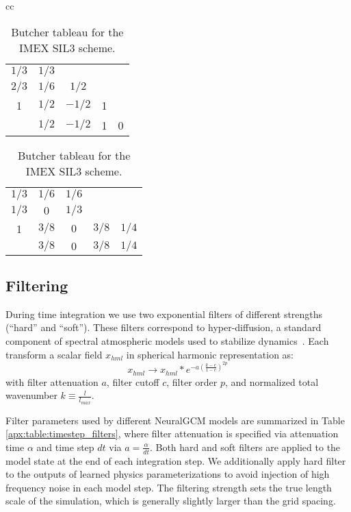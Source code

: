 \documentclass[sn-nature,Numbered]{sn-jnl}%
\begin{document}
\begin{appendices}
\begin{table}[h]
\begin{tabular}{ cc }
    \begin{tabular}{c|cccc}
    $1 / 3$ & $1 / 3$ & & & \\
    $2 / 3$ & $1 / 6$ & $1 / 2$ & & \\
    1 & $1 / 2$ & $-1 / 2$ & 1 & \\
    \hline & $1 / 2$ & $-1 / 2$ & 1 & 0 
    \end{tabular}
    \begin{tabular}{c|cccc}
    $1 / 3$ & $1 / 6$ & $1 / 6$ & & \\
    $1 / 3$ & $0$ & $1 / 3$ & & \\
    1 & $3 / 8$ & $0$ & $3 / 8$ & $1 / 4$ \\
    \hline & $3 / 8$ & $0$ & $3 / 8$ & $1 / 4$
    \end{tabular}
\end{tabular}
\caption{Butcher tableau for the IMEX SIL3 scheme.}\label{apx:table:butcher_tableau}
\end{table}

\subsection{Filtering}\label{apx:subsec:timestep_filtering}

During time integration we use two exponential filters of different
strengths (``hard'' and ``soft'').  These filters correspond to
hyper-diffusion, a standard component of spectral atmospheric models
used to stabilize dynamics~.  Each
transform a scalar field $x_{hml}$ in spherical harmonic
representation as:
\begin{equation}
    x_{hml} \rightarrow x_{hml} * e^{-a\left(\frac{k-c}{1-c}\right)^{2p}}
\end{equation}
with filter attenuation $a$, filter cutoff $c$, filter order $p$, and normalized total wavenumber $k\equiv\frac{l}{l_{max}}$.

Filter parameters used by different NeuralGCM models are summarized in
Table \ref{apx:table:timestep_filters}, where filter attenuation is
specified via attenuation time $\alpha$ and time step $dt$ via
$a=\frac{\alpha}{dt}$. Both hard and soft filters are applied to the
model state at the end of each integration step. We additionally apply
hard filter to the outputs of learned physics parameterizations to
avoid injection of high frequency noise in each model step. The
filtering strength sets the true length scale of the simulation, which
is generally slightly larger than the grid spacing.


\end{appendices}
\end{document}
